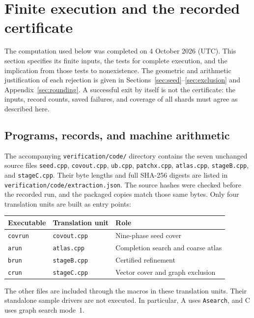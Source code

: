 \section{Finite execution and the recorded certificate}
\label{sec:execution}

The computation used below was completed on 4 October 2026 (UTC). This
section specifies its finite inputs, the tests for complete execution,
and the implication from those tests to nonexistence. The geometric and
arithmetic justification of each rejection is given in
Sections~\ref{sec:seed}--\ref{sec:exclusion} and
Appendix~\ref{sec:rounding}. A successful exit by itself is not the
certificate: the inputs, record counts, saved failures, and coverage of
all shards must agree as described here.

\subsection{Programs, records, and machine arithmetic}
\label{execute:programs}

The accompanying \texttt{verification/code/} directory contains the seven unchanged
source files \texttt{seed.cpp}, \texttt{covout.cpp}, \texttt{ub.cpp},
\texttt{patchx.cpp}, \texttt{atlas.cpp}, \texttt{stageB.cpp}, and
\texttt{stageC.cpp}. Their byte lengths and full SHA-256 digests are
listed in \texttt{verification/code/extraction.json}. The source hashes were checked
before the recorded run, and the packaged copies match those same bytes.
Only four translation units are
built as entry points:
\begin{center}
\begin{tabular}{lll}
\toprule
Executable & Translation unit & Role\\
\midrule
\texttt{covrun} & \texttt{covout.cpp} & Nine-phase seed cover\\
\texttt{arun} & \texttt{atlas.cpp} & Completion search and coarse atlas\\
\texttt{brun} & \texttt{stageB.cpp} & Certified refinement\\
\texttt{crun} & \texttt{stageC.cpp} & Vector cover and graph exclusion\\
\bottomrule
\end{tabular}
\end{center}
The other files are included through the macros in these translation
units. Their standalone sample drivers are not executed. In particular,
A uses \texttt{Asearch}, and C uses graph search mode~1.

